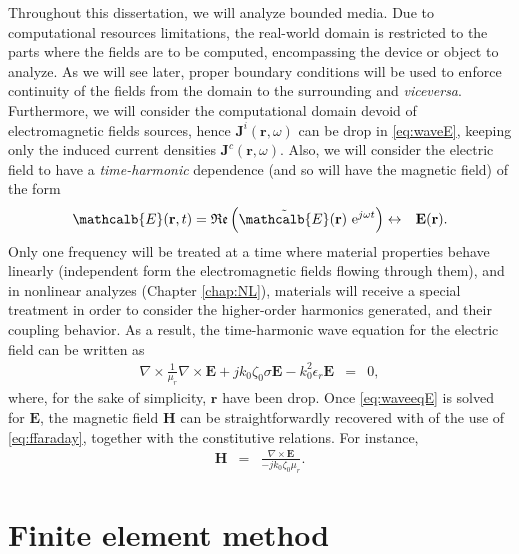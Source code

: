 Throughout this dissertation, we will analyze bounded media. Due to computational resources limitations, the real-world domain is restricted to the parts where the fields are to be computed, encompassing the device or object to analyze. As we will see later, proper boundary conditions will be used to enforce continuity of the fields from the domain to the surrounding and \textit{viceversa}. Furthermore, we will consider the computational domain devoid of electromagnetic fields sources, hence ${\mathbf{J}^i}(\mathbf{r},\omega)$ can be drop in \eqref{eq:waveE}, keeping only the induced current densities ${\mathbf{J}^c}(\mathbf{r},\omega)$. Also, we will consider the electric field to have a \textit{time-harmonic} dependence (and so will have the magnetic field) of the form
\begin{eqnarray}
\mathcalb{E}(\mathbf{r},t) =  \mathfrak{Re} \left( \tilde{\mathcalb{E}}(\mathbf{r}) \ \exp{j\omega t} \right) &\leftrightarrow &{\mathbf{E}(\mathbf{r})}. \label{eq:waveHarmE}
\end{eqnarray}
\noindent Only one frequency will be treated at a time where material properties behave linearly (independent form the electromagnetic fields flowing through them), and in nonlinear analyzes (Chapter \ref{chap:NL}), materials will receive a special treatment in order to consider the higher-order harmonics generated, and their coupling behavior. As a result, the time-harmonic wave equation for the electric field can be written as
\begin{eqnarray}
\nabla \times \frac{1}{\mu_r} \nabla \times {\mathbf{E}} + j k_0 \zeta_0 \sigma {\mathbf{E}} - k_0^2 \epsilon_r {\mathbf{E}} &= & 0, \label{eq:waveeqE}
\end{eqnarray}
\noindent where, for the sake of simplicity, $\mathbf{r}$ have been drop. Once \eqref{eq:waveeqE} is solved for $\mathbf{E}$, the magnetic field $\mathbf{H}$ can be straightforwardly recovered with of the use of \eqref{eq:ffaraday}, together with the constitutive relations. For instance,
\begin{eqnarray}
{\mathbf{H}} &= & \frac{\nabla \times {\mathbf{E}}}{-j k_0\zeta_0\mu_r}.  \label{eq:waveeqErecH}
\end{eqnarray}

\section{Finite element method}

